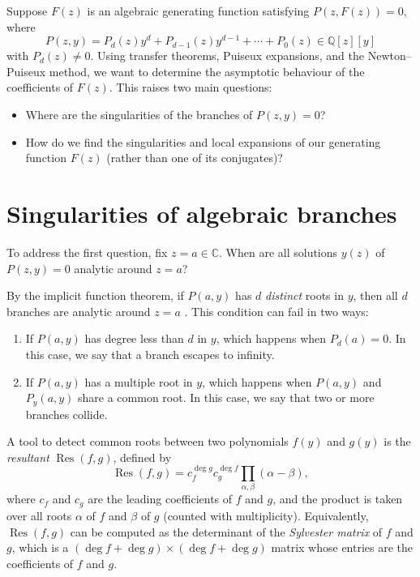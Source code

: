 
Suppose \(F(z)\) is an algebraic generating function satisfying \(P(z, F(z)) = 0\), where
\[
    P(z, y) = P_d(z) y^d + P_{d-1}(z) y^{d-1} + \cdots + P_0(z) \in \mathbb{Q}[z][y]
\]
with \(P_d(z) \neq 0\).
Using transfer theorems, Puiseux expansions, and the Newton--Puiseux method, we want to determine the asymptotic behaviour of the coefficients of \(F(z)\).
This raises two main questions:
\begin{itemize}
    \item Where are the singularities of the branches of \(P(z, y) = 0\)?
    \item How do we find the singularities and local expansions of our generating function \(F(z)\) (rather than one of its conjugates)?
\end{itemize}

\section*{Singularities of algebraic branches}

To address the first question, fix \(z = a \in \mathbb{C}\).
When are all solutions \(y(z)\) of \(P(z, y) = 0\) analytic around \(z = a\)?

By the implicit function theorem, if \(P(a, y)\) has \(d\) \emph{distinct} roots in \(y\), then all \(d\) branches are analytic around \(z = a\) \cite[Section 2.3, p.~46]{Melczer2021}.
This condition can fail in two ways:
\begin{enumerate}[label=\Alph*.]
    \item If \(P(a, y)\) has degree less than \(d\) in \(y\), which happens when \(P_d(a) = 0\). In this case, we say that a branch escapes to infinity.
    \item If \(P(a, y)\) has a multiple root in \(y\), which happens when \(P(a, y)\) and \(P_y(a, y)\) share a common root. In this case, we say that two or more branches collide.
\end{enumerate}

\begin{definition}
    A tool to detect common roots between two polynomials \(f(y)\) and \(g(y)\) is the \emph{resultant} \(\operatorname{Res}(f, g)\), defined by
    \[
        \operatorname{Res}(f, g) = c_f^{\deg g} c_g^{\deg f} \prod_{\alpha, \beta} (\alpha - \beta),
    \]
    where \(c_f\) and \(c_g\) are the leading coefficients of \(f\) and \(g\), and the product is taken over all roots \(\alpha\) of \(f\) and \(\beta\) of \(g\) (counted with multiplicity).
    Equivalently, \(\operatorname{Res}(f, g)\) can be computed as the determinant of the \emph{Sylvester matrix} of \(f\) and \(g\), which is a \((\deg f + \deg g) \times (\deg f + \deg g)\) matrix whose entries are the coefficients of \(f\) and \(g\).
\end{definition}


